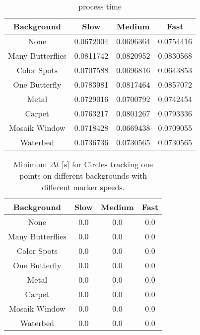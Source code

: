 \begin{table}[H]
\center
\begin{tabular}{|c|c|c|c|}
\hline
Background & Slow & Medium & Fast \\ \hline
None & 0.0672004 & 0.0696364 & 0.0754416 \\ \hline
Many Butterflies & 0.0811742 & 0.0820952 & 0.0830568 \\ \hline
Color Spots & 0.0707588 & 0.0696816 & 0.0643853 \\ \hline
One Butterfly & 0.0783981 & 0.0817464 & 0.0857072 \\ \hline
Metal & 0.0729016 & 0.0700792 & 0.0742454 \\ \hline
Carpet & 0.0763217 & 0.0801267 & 0.0793336 \\ \hline
Mosaik Window & 0.0718428 & 0.0669438 & 0.0709055 \\ \hline
Waterbed & 0.0736736 & 0.0730565 & 0.0730565 \\ \hline
\end{tabular}
\caption{process time}
\end{table}


\begin{table}[H]
\center
\begin{tabular}{|c|c|c|c|}
\hline
Background & Slow & Medium & Fast \\ \hline
None & 0.0 & 0.0 & 0.0 \\ \hline
Many Butterflies & 0.0 & 0.0 & 0.0 \\ \hline
Color Spots & 0.0 & 0.0 & 0.0 \\ \hline
One Butterfly & 0.0 & 0.0 & 0.0 \\ \hline
Metal & 0.0 & 0.0 & 0.0 \\ \hline
Carpet & 0.0 & 0.0 & 0.0 \\ \hline
Mosaik Window & 0.0 & 0.0 & 0.0 \\ \hline
Waterbed & 0.0 & 0.0 & 0.0 \\ \hline
\end{tabular}
\caption{Minimum $\Delta t$ [s] for Circles tracking one points on different backgrounds with different marker speeds.}
\end{table}


